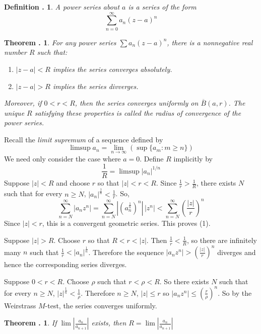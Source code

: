 \documentclass[twoside]{report}
\newcounter{Lecture}
\theoremstyle{myts}
\newcounter{c}[Lecture]
\newtheorem{dfn}[c]{Definition \arabic{Lecture}.}
\newtheorem{thm}[c]{Theorem \arabic{Lecture}.}
\newcounter{ex}[Lecture]
\newenvironment{prf}{
  \noindent\begin{mdframed}[style=prf]}{\end{mdframed} \vspace{1em}
}
\begin{document}
\begin{dfn}
  A \emph{power series} about $a$ is a series of the form
  \[
   \sum_{n=0}^\infty a_n (z-a)^n
  \]
\end{dfn}


\begin{thm}
  For any power series \( \sum a_n (z-a)^n \), there is a nonnegative real number $R$ such that:
  \begin{enumerate}[(1)]
    \item \( |z-a| < R \) implies the series converges absolutely.
    \item \( |z-a| > R \) implies the series divverges.
  \end{enumerate}
  Moreover, if \(0<r<R\), then the series converges uniformly on \(\overline{B}(a,r)\).
  The unique $R$ satisfying these properties is called the \emph{radius of convergence} of the power series.
\end{thm}

\begin{prf}
  Recall the \emph{limit supremum} of a sequence defined by
  \[
    \limsup a_n = \lim_{n\to\infty} \left( \sup \{ a_m : m\geq n \} \right)
  \]
  We need only consider the case where \( a = 0 \). Define $R$ implicitly by
  \[
    \frac{1}{R} = \limsup |a_n|^{1/n}
  \]
  Suppose \( |z| < R \) and choose $r$ so that \( |z| < r < R \). Since \(\frac{1}{r} > \frac{1}{R} \), there exists $N$ such that for every \(n\geq N\), \( |a_n|^{\frac{1}{n}} < \frac{1}{r} \). So,
  \[
      \sum_{n=N}^\infty |a_n z^n| = \sum_{n=N}^\infty \left| (a_n^{\frac{1}{n}})^n \right| \, |z^n| < \sum_{n=N}^\infty \left( \frac{|z|}{r} \right)^n
  \]
  Since \( |z| < r \), this is a convergent geometric series. This proves (1).
  
  \noindent
  Suppose \( |z| > R \). Choose $r$ so that \(R<r<|z|\). Then \(\frac{1}{r} < \frac{1}{R} \), so there are infinitely many $n$ such that \( \frac{1}{r} < |a_n|^{\frac{1}{n}}\). Therefore the sequence \( |a_n z^n| > \left( \frac{|z|}{r} \right)^n \) diverges and hence the corresponding series diverges.

  \noindent
  Suppose \(0 < r < R\). Choose $\rho$ such that \( r < \rho < R \). So there exists $N$ such that for every \(n\geq N\), \( |z| ^{\frac{1}{n}} < \frac{1}{\rho} \). Therefore \(n\geq N\), \( |z| \leq r \) so \( |a_n z^n| \leq \left( \frac{r}{\rho} \right)^n \). So by the Weirstrass $M$-test, the series converges uniformly. 
\end{prf}

\begin{thm}
  If \( \lim \left| \frac{a_n}{a_{n+1}} \right| \) exists, then \( R = \lim \left| \frac{a_n}{a_{n+1}} \right| \)
\end{thm}
\end{document}
